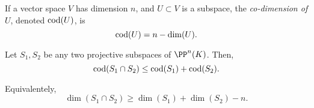 \begin{defn}
	If a vector space $V$ has dimension $n$, and $U \subset V$ is a subspace, the \emph{co-dimension of $U$}, denoted $\operatorname{cod}(U)$, is  \[
		\operatorname{cod}(U) = n - \dim(U).
	\]
\end{defn}

\begin{lem}
	Let $S_1, S_2$ be any two projective subspaces of $\PP^n(K)$. Then, \[
		\operatorname{cod}(S_1 \cap S_2) \le \operatorname{cod}(S_1) + \operatorname{cod}(S_2).
	\]

	Equivalentely, \[
		\dim(S_1 \cap S_2) \ge \dim(S_1) + \dim(S_2) - n.
	\]
\end{lem}
